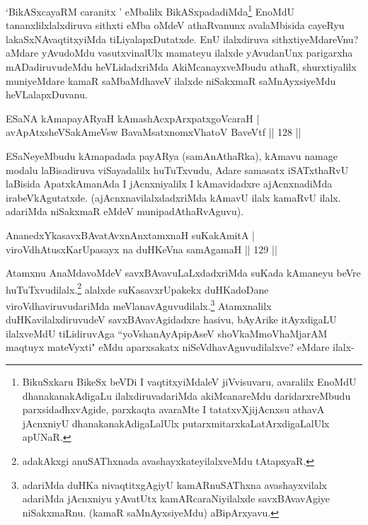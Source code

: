 \begin{artha}
`BikASxcayaRM caranitx ' eMbalilx BikASxpadadiMda\footnote[1]{BikuSxkaru BikeSx beVDi I vaqtitxyiMdaleV jiVvisuvaru, avaralilx EnoMdU dhanakanakAdigaLu ilalxdiruvadariMda  akiMcanareMdu daridarxreMbudu parxsidadhxvAgide, parxkaqta avaraMte I tatatxvXjijAcnxsu athavA jAcnxniyU dhanakanakAdigaLalUlx putarxmitarxkaLatArxdigaLalUlx apUNaR.} EnoMdU tananxlilxlalxdiruva sithxti eMba oMdeV athaRvanunx avalaMbisida cayeRyu lakaSxNAvaqtitxyiMda tiLiyalapxDutatxde. EnU ilalxdiruva sithxtiyeMdareVnu? aMdare yAvudoMdu vasutxvinalUlx mamateyu ilalxde yAvudanUnx parigarxha mADadiruvudeMdu heVLidadxriMda AkiMcanayxveMbudu athaR, shurxtiyalilx muniyeMdare kamaR saMbaMdhaveV ilalxde niSakxmaR saMnAyxsiyeMdu heVLalapxDuvanu.
\end{artha}%


\begin{shl}
ESaNA kAmapayARyaH kAmashAcxpArxpatxgoVcaraH |\\
avApAtxsheVSakAmeV\s sw BavaMsatxnomxVhatoV BaveVtf \hfill || 128 ||
\end{shl}

\begin{artha}
ESaNeyeMbudu kAmapadada payARya (samAnAthaRka), kAmavu namage modalu laBisadiruva viSayadalilx huTuTxvudu, Adare samasatx iSATxthaRvU laBisida ApatxkAmanAda I jAcnxniyalilx I kAmavidadxre ajAcnxnadiMda irabeVkAgutatxde. (ajAcnxnavilalxdadxriMda kAmavU ilalx kamaRvU ilalx. adariMda  niSakxmaR eMdeV munipadAthaRvAguvu).
\end{artha}


\begin{shl}
AnanedxYkasavxBAvatAvxnAnx\s \s tamxnaH suKakAmitA |\\
viroVdhAtusxKarUpasayx na duHKeVna samAgamaH \hfill || 129 ||
\end{shl}

\begin{artha}
Atamxnu AnaMdavoMdeV savxBAvavuLaLxdadxriMda suKada kAmaneyu beVre huTuTxvudilalx.\footnote[1]{adakAkxgi anuSAThxnada avashayxkateyilalxveMdu tAtapxyaR.} alalxde suKasavxrUpakekx duHKadoDane viroVdhaviruvudariMda meVlanavAguvudilalx.\footnote[2]{adariMda duHKa nivaqtitxgAgiyU kamARnuSAThxna avashayxvilalx adariMda jAcnxniyu yAvatUtx kamARcaraNiyilalxde savxBAvavAgiye niSakxmaRnu. (kamaR saMnAyxsiyeMdu) aBipArxyavu.} Atamxnalilx duHKavilalxdiruvudeV savxBAvavAgidadxre hasivu, bAyArike itAyxdigaLU ilalxveMdU tiLidiruvAga ``yoV\s shanAyApipAseV shoVkaMmoVhaMjarAM maqtuyx mateVyxti" eMdu aparxsakatx niSeVdhavAguvudilalxve? eMdare ilalx-
\end{artha}%


